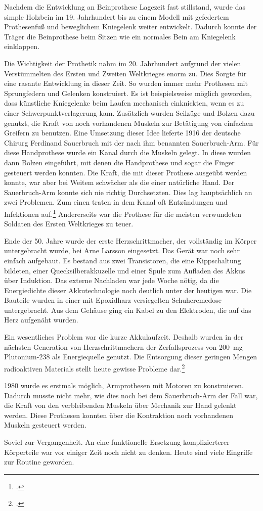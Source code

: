 Nachdem die Entwicklung an Beinprothese Lagezeit fast stillstand, wurde das simple Holzbein im 19.
Jahrhundert bis zu einem Modell mit gefedertem Prothesenfuß und beweglichem Kniegelenk weiter
entwickelt. Dadurch konnte der Träger die Beinprothese beim Sitzen wie ein normales Bein am
Kniegelenk einklappen.

Die Wichtigkeit der Prothetik nahm im 20. Jahrhundert aufgrund der vielen Verstümmelten des Ersten
und Zweiten Weltkrieges enorm zu. Dies Sorgte für eine rasante Entwicklung in dieser Zeit. So wurden
immer mehr Prothesen mit Sprungfedern und Gelenken konstruiert. Es ist beispielsweise möglich
geworden, dass künstliche Kniegelenke beim Laufen mechanisch einknickten, wenn es zu einer
Schwerpunktverlagerung kam. Zusätzlich wurden Seilzüge und Bolzen dazu genutzt, die Kraft von noch
vorhandenen Muskeln zur Betätigung von einfachen Greifern zu benutzen. Eine Umsetzung dieser Idee
lieferte 1916 der deutsche Chirurg Ferdinand Sauerbruch mit der nach ihm benannten Sauerbruch-Arm.
Für diese Handprothese wurde ein Kanal durch die Muskeln gelegt. In diese wurden dann Bolzen
eingeführt, mit denen die Handprothese und sogar die Finger gesteuert werden konnten. Die Kraft, die
mit dieser Prothese ausgeübt werden konnte, war aber bei Weitem schwächer als die einer natürliche
Hand. Der Sauerbruch-Arm konnte sich nie richtig Durchsetzten. Dies lag hauptsächlich an zwei
Problemen. Zum einen traten in dem Kanal oft Entzündungen und Infektionen
auf.\footcite{thesis:Karpa:Geschichte_Armprothesen}
Andererseits war die
Prothese für die meisten verwundeten Soldaten des Ersten Weltkrieges zu teuer.

Ende der 50. Jahre wurde der erste Herzschrittmacher, der vollständig im Körper untergebracht wurde,
bei Arne Larsson eingesetzt. Das Gerät war noch sehr einfach aufgebaut. Es bestand aus zwei
Transistoren, die eine Kippschaltung bildeten, einer Quecksilberakkuzelle und einer Spule zum
Aufladen des Akkus über Induktion. Das externe Nachladen war jede Woche nötig, da die Energiedichte
dieser Akkutechnologie noch deutlich unter der heutigen war. Die Bauteile wurden in einer mit
Epoxidharz versiegelten Schuhcremedose untergebracht. Aus dem Gehäuse ging ein Kabel zu den
Elektroden, die auf das Herz aufgenäht wurden.

Ein wesentliches Problem war die kurze Akkulaufzeit. Deshalb wurden in der nächsten Generation
von Herzschrittmachern der Zerfallsprozess von \SI{200}{\milli\gram} Plutonium-238 als Energiequelle
genutzt. Die Entsorgung dieser geringen Mengen radioaktiven
Materials stellt heute gewisse Probleme dar.\footcite{DRadio:strahlendes_Herz}

1980 wurde es erstmals möglich, Armprothesen mit Motoren zu konstruieren. Dadurch musste nicht mehr,
wie dies noch bei dem Sauerbruch-Arm der Fall war, die Kraft von den verbleibenden Muskeln über
Mechanik zur Hand gelenkt werden. Diese Prothesen konnten über die Kontraktion noch vorhandenen
Muskeln gesteuert werden.

\bigskip
Soviel zur Vergangenheit. An eine funktionelle Ersetzung komplizierterer Körperteile war vor einiger
Zeit noch nicht zu denken. Heute sind viele Eingriffe zur Routine geworden.